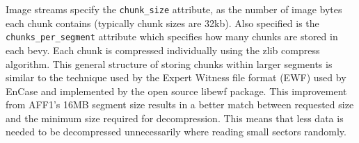 \documentclass[10pt, conference]{IEEEtran}
\begin{document}
Image streams specify the \texttt{chunk\_size} attribute, as the
number of image bytes each chunk contains (typically chunk sizes are
32kb). Also specified is the \texttt{chunks\_per\_segment} attribute
which specifies how many chunks are stored in each bevy. Each chunk is
compressed individually using the zlib compress algorithm. This
general structure of storing chunks within larger segments is similar
to the technique used by the Expert Witness file format (EWF) used by
EnCase\cite{encase-3.0} and implemented by the open source
libewf\cite{libewf} package. This improvement from AFF1's 16MB segment
size results in a better match between requested size and the minimum
size required for decompression. This means that less data is needed
to be decompressed unnecessarily where reading small sectors randomly.




\end{document}
